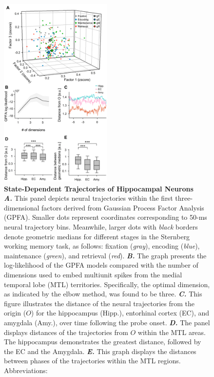 \documentclass[final,3p,times,twocolumn]{elsarticle}
\begin{document}
        \clearpage
        \begin{figure}[ht]
        	\centering
            \includegraphics[width=0.5\textwidth]{./src/figures/.png/Figure_ID_02.png}
        	\caption{\textbf{
State-Dependent Trajectories of Hippocampal Neurons
}
\smallskip
\\
\textbf{\textit{A.}} This panel depicts neural trajectories within the first three-dimensional factors derived from Gaussian Process Factor Analysis (GPFA). Smaller dots represent coordinates corresponding to 50-ms neural trajectory bins. Meanwhile, larger dots with \textit{black} borders denote geometric medians for different stages in the Sternberg working memory task, as follows: fixation (\textit{gray}), encoding (\textit{blue}), maintenance (\textit{green}), and retrieval (\textit{red}). \textbf{\textit{B.}} The graph presents the log-likelihood of the GPFA models compared with the number of dimensions used to embed multiunit spikes from the medial temporal lobe (MTL) territories. Specifically, the optimal dimension, as indicated by the elbow method, was found to be three. \textbf{\textit{C.}} This figure illustrates the distance of the neural trajectories from the origin ($O$) for the hippocampus (Hipp.), entorhinal cortex (EC), and amygdala (Amy.), over time following the probe onset. \textbf{\textit{D.}} The panel displays distances of the trajectories from $O$ within the MTL areas. The hippocampus demonstrates the greatest distance, followed by the EC and the Amygdala. \textbf{\textit{E.}} This graph displays the distances between phases of the trajectories within the MTL regions.
Abbreviations:
}
        	\label{fig:02}
        \end{figure}
\end{document}
